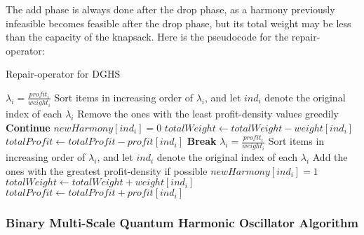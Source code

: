 \documentclass[titlepage]{article}
\begin{document}
The add phase is always done after the drop phase, as a harmony previously infeasible becomes feasible after the drop phase, but its total weight may be less than the capacity of the knapsack. Here is the pseudocode for the repair-operator:

\vskip 0.5cm
\begin{breakablealgorithm}
\caption{Repair-operator for DGHS}\label{harmonyRepair}
    \begin{algorithmic}[1]
             \Comment{\textcolor{blue}{DROP phase}}
                \State $\lambda_{i} = \frac{profit_{i}}{weight_{i}}$
            \EndFor
            \State Sort items in increasing order of $\lambda_{i}$, and let $ind_{i}$ denote the original index of each $\lambda_{i}$
            \State Remove the ones with the least profit-density values greedily
                    \State \textbf{Continue}
                \EndIf
                \State $newHarmony[ind_{i}] = 0$ \Comment{\textcolor{blue}{Unload the item}}
                \State $totalWeight \gets totalWeight - weight[ind_{i}]$
                \State $totalProfit \gets totalProfit - profit[ind_{i}]$
                    \State \textbf{Break} \Comment{\textcolor{blue}{Terminate DROP phase}}
                \EndIf
            \EndFor
        \EndIf
             \Comment{\textcolor{blue}{ADD phase}}
                \State $\lambda_{i} = \frac{profit_{i}}{weight_{i}}$
            \EndFor
            \State Sort items in increasing order of $\lambda_{i}$, and let $ind_{i}$ denote the original index of each $\lambda_{i}$
                \State Add the ones with the greatest profit-density if possible 
                        \State $newHarmony[ind_{i}] = 1$
                        \State $totalWeight \gets totalWeight + weight[ind_{i}]$
                        \State $totalProfit \gets totalProfit + profit[ind_{i}]$
                    \EndIf
                \EndIf
            \EndFor
        \EndIf
    \end{algorithmic}
\end{breakablealgorithm}

\vskip 1cm
\subsubsection{Binary Multi-Scale Quantum Harmonic Oscillator Algorithm}
\end{document}

